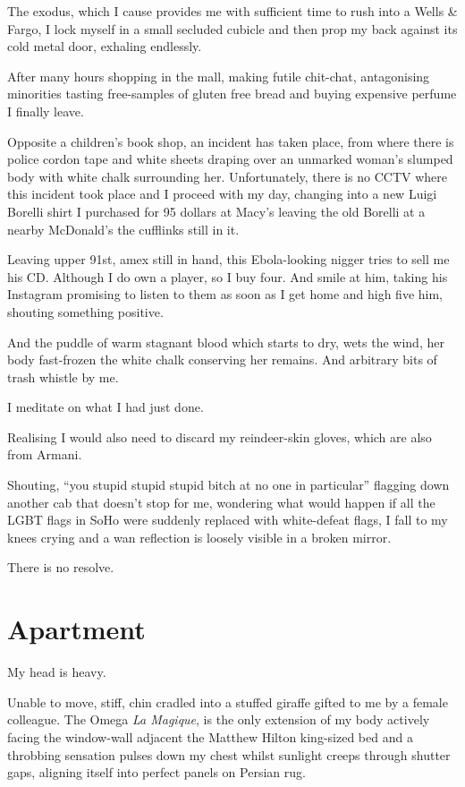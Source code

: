 \documentclass[19pt,openany]{book}
\begin{document}
The exodus, which I cause
provides me with sufficient time
to rush into a Wells \& Fargo,
I lock myself in a small
secluded cubicle and then
prop my back against its cold metal door,
exhaling endlessly.

After many hours
shopping in the mall,
making futile chit-chat,
antagonising minorities
tasting free-samples
of gluten free bread and
buying expensive perfume
I finally leave.

Opposite a children's
book shop, an incident
has taken place, from
where there is police cordon tape
and white sheets draping over
an unmarked woman's slumped body with
white
chalk surrounding her.
Unfortunately, there is no CCTV
where this incident took place
and I proceed with my day,
changing into a new Luigi Borelli
shirt I purchased for 95 dollars
at Macy's
leaving the old Borelli
at a nearby McDonald's
the cufflinks still in it.

Leaving upper 91st, amex still in hand,
this Ebola-looking nigger tries to sell
me his CD. Although I do own a player,
so I buy
four. And smile at him, taking his Instagram
promising to listen to them as soon as I get
home and high five him, shouting something positive.

And the puddle of warm stagnant blood
which starts
to dry, wets the wind,
her body fast-frozen
the white chalk conserving her remains.
And arbitrary bits of trash
whistle by me.

I meditate on what I had just done.

Realising
I would also need to discard my reindeer-skin
gloves, which are also from Armani.

Shouting, ``you stupid stupid stupid
bitch at no one in particular'' flagging
down another cab that doesn't stop for me, wondering
what would happen if all the LGBT flags in SoHo
were suddenly replaced with white-defeat flags, I fall
to my knees crying and a wan reflection is loosely
visible in a broken mirror.

There is no resolve.
\chapter{Apartment}
My head is heavy.

Unable to move, stiff, chin
cradled into a stuffed
giraffe gifted to me
by a female colleague.
The Omega \textit{La Magique},
is the only extension
of my body actively
facing the window-wall adjacent
the Matthew Hilton king-sized bed and
a throbbing sensation pulses
down my chest whilst sunlight
creeps through
shutter gaps, aligning itself into perfect panels
on Persian rug.
\end{document}
